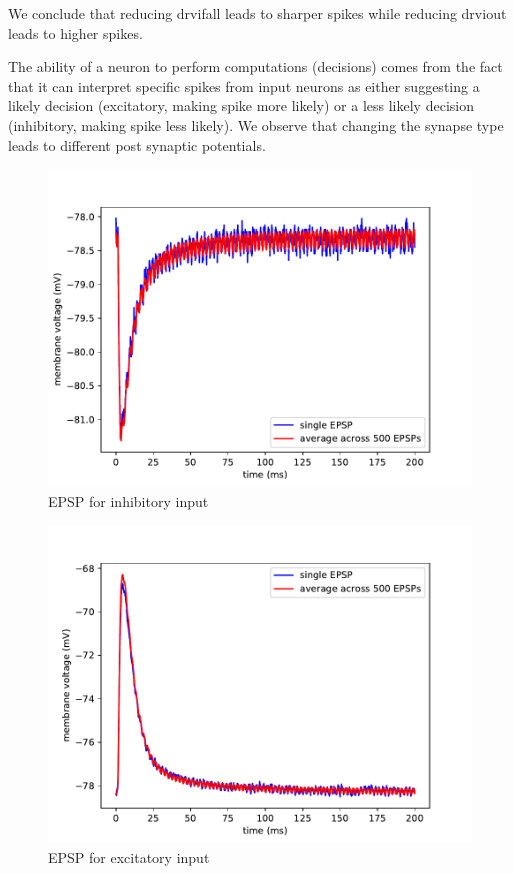 \documentclass[a4paper,twocolumn]{article}
\begin{document}
We conclude that reducing drvifall leads to sharper spikes while reducing drviout
leads to higher spikes.  \par
The ability of a neuron to perform computations (decisions) comes from the fact
that it can interpret specific spikes from input neurons as either suggesting
a likely decision (excitatory,  making spike more likely) or  a less likely decision
(inhibitory, making spike less likely).  We observe that changing the synapse type
leads to different post synaptic potentials.
\begin{figure}[ht]
    \centering
    \includegraphics[width=.5\textwidth]{figures/epsp_inh_fall_03_out_05.pdf}
    \caption{EPSP for inhibitory input}
    \label{fig:epsp_inh_fall}
\end{figure}
\begin{figure}[ht]
    \centering
    \includegraphics[width=.5\textwidth]{figures/epsp_exc_fall_03_out_05.pdf}
    \caption{EPSP for excitatory input}
    \label{fig:epsp_exc_fall}
\end{figure}
\end{document}
